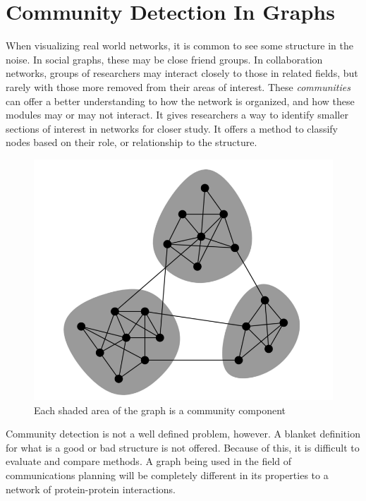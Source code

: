 \section{Community Detection In Graphs}
When visualizing real world networks, it is common to see some structure in the noise. In social graphs, these may be close friend groups. In collaboration networks, groups of researchers may interact closely to those in related fields, but rarely with those more removed from their areas of interest. These \textit{communities} can offer a better understanding to how the network is organized, and how these modules may or may not interact. It gives researchers a way to identify smaller sections of interest in networks for closer study. It offers a method to classify nodes based on their role, or relationship to the structure.
\begin{figure}[!h]
	\begin{center}
		\includegraphics[scale=0.7]{images/communities.png}
	\end{center}
	\caption{Each shaded area of the graph is a community component}
	\label{logo}
\end{figure}


Community detection is not a well defined problem, however. A blanket definition for what is a good or bad structure is not offered. Because of this, it is difficult to evaluate and compare methods. A graph being used in the field of communications planning will be completely different in its properties to a network of protein-protein interactions.


